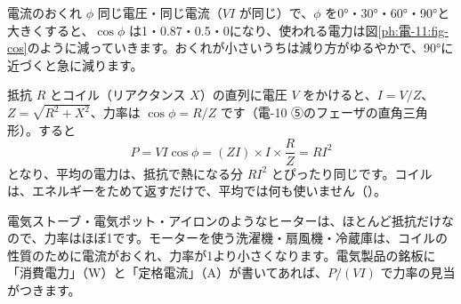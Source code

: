 \begin{phbaisuru}[大きく]{電流のおくれ $\phi$}
同じ電圧・同じ電流（$VI$ が同じ）で、$\phi$ を0°・30°・60°・90°と大きくすると、$\cos\phi$ は1・0.87・0.5・0になり、使われる電力は図\ref{ph:電-11:fig-cos}のように減っていきます。おくれが小さいうちは減り方がゆるやかで、90°に近づくと急に減ります。

\begin{bkcenter}
\end{bkcenter}
\label{ph:電-11:fig-cos}
\end{phbaisuru}

抵抗 $R$ とコイル（リアクタンス $X$）の直列に電圧 $V$ をかけると、$I=V/Z$、$Z=\sqrt{R^2+X^2}$、力率は $\cos\phi=R/Z$ です（電-10 ⑤のフェーザの直角三角形）。すると
\[P=VI\cos\phi=(ZI)\times I\times\frac{R}{Z}=RI^2\]
となり、平均の電力は、抵抗で熱になる分 $RI^2$ とぴったり同じです。コイルは、エネルギーをためて返すだけで、平均では何も使いません（）。

\begin{phflow}[交流の電力]
\end{phflow}

\begin{phmijika}[電気製品の力率]
電気ストーブ・電気ポット・アイロンのようなヒーターは、ほとんど抵抗だけなので、力率はほぼ1です。モーターを使う洗濯機・扇風機・冷蔵庫は、コイルの性質のために電流がおくれ、力率が1より小さくなります。電気製品の銘板に「消費電力」（W）と「定格電流」（A）が書いてあれば、$P/(VI)$ で力率の見当がつきます。
\end{phmijika}

